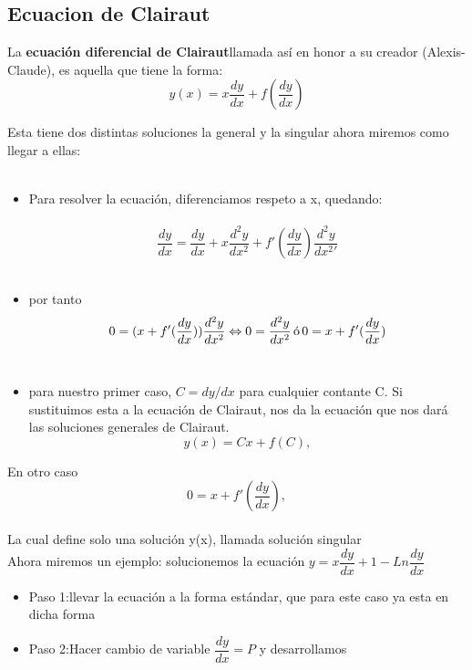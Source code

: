 \documentclass[10pt,a4paper]{article}
\begin{document}
{{{{{{{{{{{{  \subsection{Ecuacion de Clairaut}
  
  La \textbf{ecuación diferencial de Clairaut}llamada así en honor a su creador (Alexis-Claude), es aquella que tiene la forma:
\begin{equation}\tag{1}
y(x)=x\dfrac{dy}{dx}+f(\dfrac{dy}{dx})
\end{equation}

Esta tiene dos distintas soluciones la general y la singular ahora miremos como llegar
a ellas:\\\,\\

\begin{itemize}

\item Para resolver la ecuación, diferenciamos respeto a x, quedando:\\\,\\
$$\dfrac{dy}{dx}=\dfrac{dy}{dx}+x\dfrac{d^{2}y}{dx^2}+f'(\dfrac{dy}{dx})\dfrac{d^{2}y}{dx^{2}{'}}$$\\


\item por tanto
$$0=(x+f'(\dfrac{dy}{dx}))\dfrac{d^{2}y}{dx^{2}}\Leftrightarrow 0=\dfrac{d^{2}y}{dx^{2}}\, \textup{ó}\, 0=x+f'(\dfrac{dy}{dx}) $$\\

\item para nuestro primer caso, $C=dy/dx$ para cualquier contante C. Si sustituimos esta a la ecuación de Clairaut, nos da la ecuación que nos dará las soluciones generales de Clairaut.
$$y(x)=Cx+f(C),$$

\end{itemize}

En otro caso
$$0=x+f'(\dfrac{dy}{dx}),$$\\

La cual define solo una solución y(x), llamada solución singular\\

Ahora miremos un ejemplo: solucionemos la ecuación
$y=x\dfrac{dy}{dx}+1-Ln \dfrac{dy}{dx}$\\
 \begin{itemize}
 \item Paso 1:llevar la ecuación a la forma estándar, que para este caso ya esta en dicha forma\\
 \item Paso 2:Hacer cambio de variable $\dfrac{dy}{dx}=P$ y desarrollamos\\
 

\end{itemize}}}}}}}}}}}}}
\end{document}
